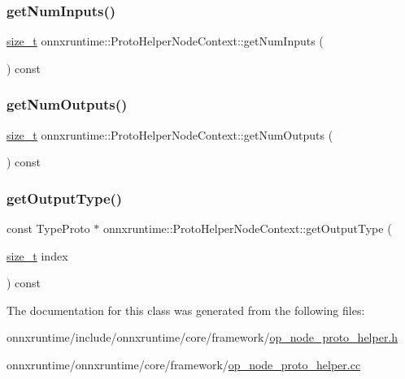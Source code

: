 \subsubsection{\texorpdfstring{get\+Num\+Inputs()}{getNumInputs()}}
{\footnotesize\ttfamily \mbox{\hyperlink{mlasi_8h_a503efbc1c6e50825320ad909366b78ab}{size\+\_\+t}} onnxruntime\+::\+Proto\+Helper\+Node\+Context\+::get\+Num\+Inputs (\begin{DoxyParamCaption}{ }\end{DoxyParamCaption}) const}

\mbox{\label{classonnxruntime_1_1ProtoHelperNodeContext_a8d173fbe4f9c640135268154868d32df}} 
\subsubsection{\texorpdfstring{get\+Num\+Outputs()}{getNumOutputs()}}
{\footnotesize\ttfamily \mbox{\hyperlink{mlasi_8h_a503efbc1c6e50825320ad909366b78ab}{size\+\_\+t}} onnxruntime\+::\+Proto\+Helper\+Node\+Context\+::get\+Num\+Outputs (\begin{DoxyParamCaption}{ }\end{DoxyParamCaption}) const}

\mbox{\label{classonnxruntime_1_1ProtoHelperNodeContext_a89edb584b2211b71b5354ba4127ea7dd}} 
\subsubsection{\texorpdfstring{get\+Output\+Type()}{getOutputType()}}
{\footnotesize\ttfamily const Type\+Proto $\ast$ onnxruntime\+::\+Proto\+Helper\+Node\+Context\+::get\+Output\+Type (\begin{DoxyParamCaption}\item[{\mbox{\hyperlink{mlasi_8h_a503efbc1c6e50825320ad909366b78ab}{size\+\_\+t}}}]{index }\end{DoxyParamCaption}) const}



The documentation for this class was generated from the following files\+:\begin{DoxyCompactItemize}
\item 
onnxruntime/include/onnxruntime/core/framework/\mbox{\hyperlink{op__node__proto__helper_8h}{op\+\_\+node\+\_\+proto\+\_\+helper.\+h}}\item 
onnxruntime/onnxruntime/core/framework/\mbox{\hyperlink{op__node__proto__helper_8cc}{op\+\_\+node\+\_\+proto\+\_\+helper.\+cc}}\end{DoxyCompactItemize}
